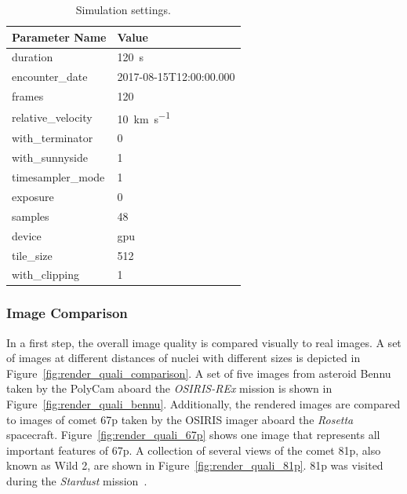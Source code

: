 \begin{table}[htb]
    \centering
    \caption{Simulation settings.}
    \label{tab:sim_settings}
    \begin{tabular}{l|l}
        \textbf{Parameter Name} & \textbf{Value} \\ \hline
        duration       & \SI{120}{\second}   \\
        encounter\_date & 2017-08-15T12:00:00.000\\
        frames       & \SI{120}{}     \\
        relative\_velocity     &  \SI{10}{\kilo\meter\per\second} \\
        with\_terminator  & \SI{0}{} \\
        with\_sunnyside & \SI{1}{} \\
        timesampler\_mode & \SI{1}{} \\
        exposure & \SI{0}{} \\
        samples & \SI{48}{} \\
        device & \gls{gpu} \\
        tile\_size & \SI{512}{} \\
        with\_clipping & \SI{1}{}
    \end{tabular}
\end{table}

\subsubsection{Image Comparison}
In a first step, the overall image quality is compared visually to real images. A set of images at different distances of nuclei with different sizes is depicted in Figure~\ref{fig:render_quali_comparison}. A set of five images from asteroid Bennu taken by the PolyCam aboard the \textit{OSIRIS-REx} mission is shown in Figure~\ref{fig:render_quali_bennu}. Additionally, the rendered images are compared to images of comet \gls{67p} taken by the OSIRIS imager aboard the \textit{Rosetta} spacecraft. Figure~\ref{fig:render_quali_67p} shows one image that represents all important features of \gls{67p}. A collection of several views of the comet \gls{81p}, also known as Wild 2, are shown in Figure~\ref{fig:render_quali_81p}. \Gls{81p} was visited during the \textit{Stardust} mission~\cite{Brownlee2003Stardust:Mission}.

